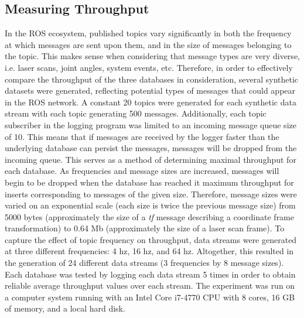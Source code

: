 \documentclass[nocopyrightspace]{acm_proc_article-sp}
\begin{document}
\subsection{Measuring Throughput}
\label{sec:throughput}
In the ROS ecosystem, published topics vary significantly in both the frequency at which messages are sent upon them, and in the size of messages belonging to the topic. This makes sense when considering that message types are very diverse, i.e. laser scans, joint angles, system events, etc. Therefore, in order to effectively compare the throughput of the three databases in consideration, several synthetic datasets were generated, reflecting potential types of messages that could appear in the ROS network. A constant 20 topics were generated for each synthetic data stream with each topic generating 500 messages. Additionally, each topic subscriber in the logging program was limited to an incoming message queue size of 10. This means that if messages are received by the logger faster than the underlying database can persist the messages, messages will be dropped from the incoming queue. This serves as a method of determining maximal throughput for each database. As frequencies and message sizes are increased, messages will begin to be dropped when the database has reached it maximum throughput for inserts corresponding to messages of the given size. Therefore, message sizes were varied on an exponential scale (each size is twice the previous message size) from 5000 bytes (approximately the size of a \textit{tf} message describing a coordinate frame transformation) to 0.64 Mb (approximately the size of a laser scan frame). To capture the effect of topic frequency on throughput, data streams were generated at three different frequencies: 4 hz, 16 hz, and 64 hz. Altogether, this resulted in the generation of 24 different data streams (3 frequencies by 8 message sizes). Each database was tested by logging each data stream 5 times in order to obtain reliable average throughput values over each stream. The experiment was run on a computer system running with an Intel Core i7-4770 CPU with 8 cores, 16 GB of memory, and a local hard disk.
\end{document}
